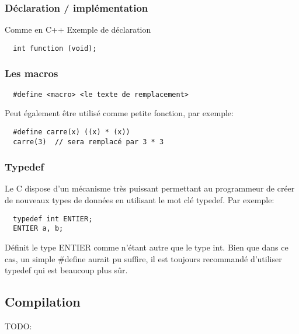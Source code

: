 \documentclass[a4paper]{article}
\begin{document}
\subsubsection{Déclaration / implémentation}
Comme en C++\newline
Exemple de déclaration
\begin{lstlisting}
  int function (void);
\end{lstlisting}
\subsubsection{Les macros}
\begin{lstlisting}
  #define <macro> <le texte de remplacement>
\end{lstlisting}
Peut également être utilisé comme petite fonction, par exemple:
\begin{lstlisting}
  #define carre(x) ((x) * (x))
  carre(3)  // sera remplacé par 3 * 3
\end{lstlisting}
\subsubsection{Typedef}
Le C dispose d'un mécanisme très puissant permettant au programmeur de créer de nouveaux types de données en utilisant le mot clé typedef. Par exemple:
\begin{lstlisting}
  typedef int ENTIER;
  ENTIER a, b;
\end{lstlisting}
Définit le type ENTIER comme n'étant autre que le type int. Bien que dans ce cas, un simple \#define aurait pu suffire, il est toujours recommandé d'utiliser typedef qui est beaucoup plus sûr.

\subsection{Compilation}
TODO:
\end{document}
